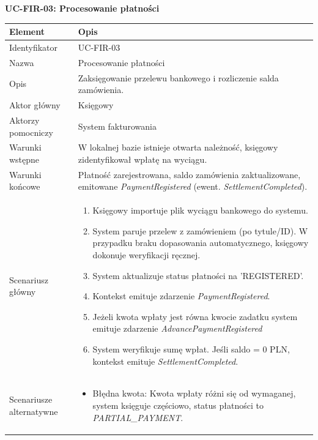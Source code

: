 \textbf{UC-FIR-03: Procesowanie płatności}

\begin{longtable}{|p{4cm}|p{11cm}|}
\hline
\textbf{Element} & \textbf{Opis} \\
\hline

Identyfikator & UC-FIR-03 \\
\hline

Nazwa & Procesowanie płatności \\
\hline

Opis & 
Zaksięgowanie przelewu bankowego i rozliczenie salda zamówienia. \\
\hline

Aktor główny & Księgowy \\
\hline

Aktorzy pomocniczy & System fakturowania \\
\hline

Warunki wstępne & 
W lokalnej bazie istnieje otwarta należność, księgowy zidentyfikował wpłatę na wyciągu. \\
\hline

Warunki końcowe & 
Płatność zarejestrowana, saldo zamówienia zaktualizowane, emitowane \textit{PaymentRegistered} (ewent. \textit{SettlementCompleted}). \\
\hline

Scenariusz główny & 
\begin{enumerate}
    \item Księgowy importuje plik wyciągu bankowego do systemu.
    \item System paruje przelew z zamówieniem (po tytule/ID). W przypadku braku dopasowania automatycznego, księgowy dokonuje weryfikacji ręcznej.
    \item System aktualizuje status płatności na 'REGISTERED'.
    \item Kontekst emituje zdarzenie \textit{PaymentRegistered}.
    \item Jeżeli kwota wpłaty jest równa kwocie zadatku system emituje zdarzenie \textit{AdvancePaymentRegistered}
    \item System weryfikuje sumę wpłat. Jeśli saldo = 0 PLN, kontekst emituje \textit{SettlementCompleted}.
\end{enumerate} \\
\hline

Scenariusze alternatywne & 
\begin{itemize}
    \item [A1] Błędna kwota: Kwota wpłaty różni się od wymaganej, system księguje częściowo, status płatności to \textit{PARTIAL\_PAYMENT}.
\end{itemize} \\
\hline
\end{longtable}


